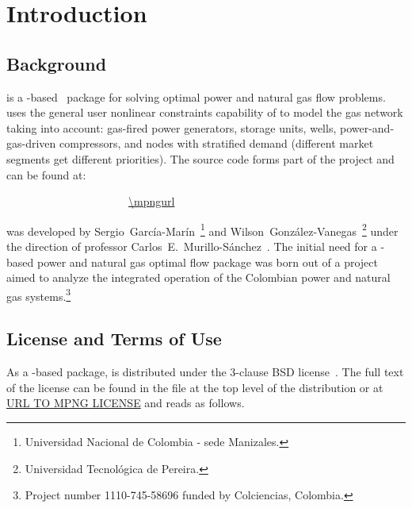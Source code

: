 \normalsize
{}
\setcounter{page}{1}

\chapter{Introduction}
\label{chap:intro}

\section{Background}
\label{sec:background}

\mpng{} is a \matpower{}-based~\cite{zimmerman2011,matpower} package for solving optimal power and natural gas flow problems. \mpng{} uses the general user nonlinear constraints capability of \matpower{} to model the gas network taking into account: gas-fired power generators, storage units, wells, power-and-gas-driven compressors, and nodes with stratified demand (different market segments get different priorities). The \mpng{} source code forms part of the \matpower{} project and can be found at:

\bigskip
~~~~~~~~~~~~~~~~~~~~~~\url{\mpngurl}
\bigskip

\noindent \mpng{} was developed by Sergio~García-Marín~\footnote[1]{ Universidad Nacional de Colombia - sede Manizales.\label{foot:UNAL}} and Wilson~González-Vanegas~\footnote[2]{ Universidad Tecnológica de Pereira.\label{foot:UTP}} under the direction of professor Carlos~E.~Murillo-S\'anchez~. The initial need for a \matpower{}-based power and natural gas optimal flow package was born out of a project aimed to analyze the integrated operation of the Colombian power and natural gas systems.\footnote[3]{ Project number 1110-745-58696 funded by Colciencias, Colombia.}

\section{License and Terms of Use}
\label{sec:license}

As a \matpower{}-based package, \mpng{} is distributed under the 3-clause BSD license~\cite{bsd}. The full text of the license can be found in the  file at the top level of the distribution or at \url{URL TO MPNG LICENSE} and reads as follows. 

